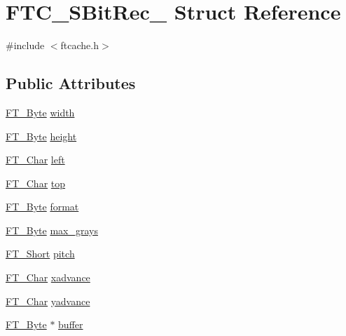 \hypertarget{struct_f_t_c___s_bit_rec__}{\section{F\-T\-C\-\_\-\-S\-Bit\-Rec\-\_\- Struct Reference}
\label{struct_f_t_c___s_bit_rec__}
}


{\ttfamily \#include $<$ftcache.\-h$>$}

\subsection*{Public Attributes}
\begin{DoxyCompactItemize}
\item 
\hyperlink{fttypes_8h_a51f26183ca0c9f4af958939648caeccd}{F\-T\-\_\-\-Byte} \hyperlink{struct_f_t_c___s_bit_rec___a5b92fb4f213a880f758bb87ac2ceb263}{width}
\item 
\hyperlink{fttypes_8h_a51f26183ca0c9f4af958939648caeccd}{F\-T\-\_\-\-Byte} \hyperlink{struct_f_t_c___s_bit_rec___a5953efe2aded3b184875d5e5d08cafef}{height}
\item 
\hyperlink{fttypes_8h_a0f851552b050883885f0a0855771f39d}{F\-T\-\_\-\-Char} \hyperlink{struct_f_t_c___s_bit_rec___aef273749f4fdb9943500ec6df8412a94}{left}
\item 
\hyperlink{fttypes_8h_a0f851552b050883885f0a0855771f39d}{F\-T\-\_\-\-Char} \hyperlink{struct_f_t_c___s_bit_rec___a3e558b3a04b70f00f80b862cdc94d9a2}{top}
\item 
\hyperlink{fttypes_8h_a51f26183ca0c9f4af958939648caeccd}{F\-T\-\_\-\-Byte} \hyperlink{struct_f_t_c___s_bit_rec___a3d3fcc2869ce5c95f0f63898e6cef8be}{format}
\item 
\hyperlink{fttypes_8h_a51f26183ca0c9f4af958939648caeccd}{F\-T\-\_\-\-Byte} \hyperlink{struct_f_t_c___s_bit_rec___a83958d4649a898312de9a7274550dff9}{max\-\_\-grays}
\item 
\hyperlink{fttypes_8h_aa7279be89046a2563cd3d4d6651fbdcf}{F\-T\-\_\-\-Short} \hyperlink{struct_f_t_c___s_bit_rec___a1382ec014df599e706c2c1785bc18235}{pitch}
\item 
\hyperlink{fttypes_8h_a0f851552b050883885f0a0855771f39d}{F\-T\-\_\-\-Char} \hyperlink{struct_f_t_c___s_bit_rec___a502a0bb69d973d2ae626a842eb9fefd3}{xadvance}
\item 
\hyperlink{fttypes_8h_a0f851552b050883885f0a0855771f39d}{F\-T\-\_\-\-Char} \hyperlink{struct_f_t_c___s_bit_rec___aabe767ddaf7ff62918886c6f62e9ac28}{yadvance}
\item 
\hyperlink{fttypes_8h_a51f26183ca0c9f4af958939648caeccd}{F\-T\-\_\-\-Byte} $\ast$ \hyperlink{struct_f_t_c___s_bit_rec___abe4d78fc3f411d67e7fc43f7aa21bd1d}{buffer}
\end{DoxyCompactItemize}


